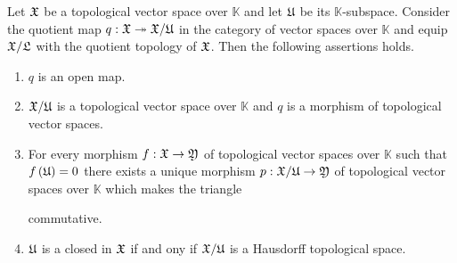 \begin{theorem}\label{theorem:quotients_of_topological_vector_spaces}
Let ${\mathfrak X}$ be a topological vector space over $\mathbb{K}$ and let ${\mathfrak U}$ be its $\mathbb{K}$-subspace. Consider the quotient map $q:{\mathfrak X}\twoheadrightarrow {\mathfrak X}/{\mathfrak U}$ in the category of vector spaces over $\mathbb{K}$ and equip ${\mathfrak X}/{\mathfrak L}$ with the quotient topology of ${\mathfrak X}$. Then the following assertions holds.
\begin{enumerate}[label=\emph{\textbf{(\arabic*)}}, leftmargin=*]
\item $q$ is an open map.
\item ${\mathfrak X}/{\mathfrak U}$ is a topological vector space over $\mathbb{K}$ and $q$ is a morphism of topological vector spaces.
\item For every morphism $f:{\mathfrak X}\rightarrow {\mathfrak Y}$ of topological vector spaces over $\mathbb{K}$ such that $f\left({\mathfrak U}\right) = 0$ there exists a unique morphism $p:{\mathfrak X}/{\mathfrak U}\rightarrow {\mathfrak Y}$ of topological vector spaces over $\mathbb{K}$ which makes the triangle
\begin{center}
\end{center}
commutative.
\item ${\mathfrak U}$ is a closed in ${\mathfrak X}$ if and ony if ${\mathfrak X}/{\mathfrak U}$ is a Hausdorff topological space.
\end{enumerate}
\end{theorem}
